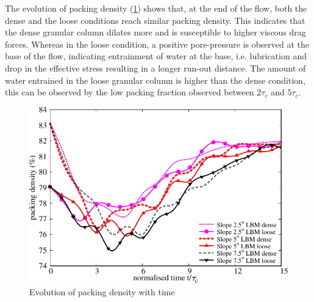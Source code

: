 The evolution of packing density (\cref{fig:voro}) shows that, at the end 
of the flow, both the dense and the loose conditions reach similar packing 
density. 
This indicates that the dense granular column dilates more and is susceptible 
to higher viscous drag forces. Whereas in the loose condition, a positive 
pore-pressure is observed at the base of the flow, indicating entrainment of 
water at the base, i.e. lubrication and drop in the effective stress resulting 
in a longer run-out distance. The amount of water entrained in the loose 
granular 
column is higher than the dense condition, this can be observed by the low 
packing fraction observed between $2\tau_c$ and $5 \tau_c$. 

\begin{figure}
\centering
\includegraphics[width=0.97\columnwidth]{Voronoi_Slope_Dense_Loose}
\caption{Evolution of packing density with time}
\label{fig:voro}
\end{figure}

